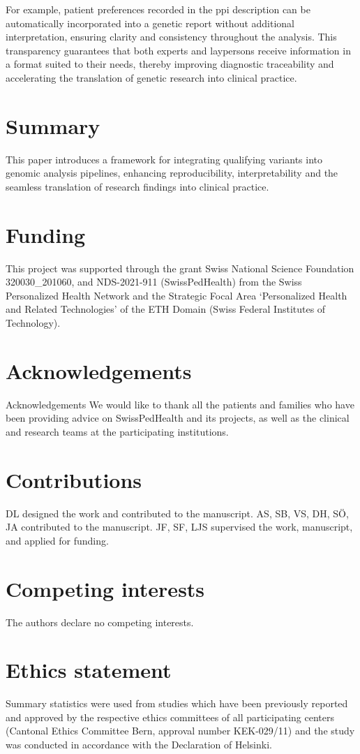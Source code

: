 For example, patient preferences recorded in the \ac{ppi} description can be automatically incorporated into a genetic report without additional interpretation, ensuring clarity and consistency throughout the analysis. This transparency guarantees that both experts and laypersons receive information in a format suited to their needs, thereby improving diagnostic traceability and accelerating the translation of genetic research into clinical practice.

\FloatBarrier

\section{Summary}
This paper introduces a framework for integrating qualifying variants into genomic analysis pipelines, enhancing reproducibility, interpretability and the seamless translation of research findings into clinical practice.

\section{Funding}
This project was supported through the grant Swiss National Science Foundation  320030\_201060, and NDS-2021-911 (SwissPedHealth) from the Swiss Personalized Health Network and the Strategic Focal Area `Personalized Health and Related Technologies' of the ETH Domain (Swiss Federal Institutes of Technology).

\section{Acknowledgements}
Acknowledgements We would like to thank all the patients and families who have been providing advice on SwissPedHealth and its projects, as well as the clinical and research teams at the participating institutions.

\section{Contributions}
DL designed the work and contributed to the manuscript.
AS, SB, VS, DH, SÖ, JA contributed to the manuscript.
JF, SF, LJS supervised the work, manuscript, and applied for funding.

\section{Competing interests}
The authors declare no competing interests.

\section{Ethics statement}
Summary statistics were used from studies which have been previously reported and approved by the respective ethics committees of all participating centers (Cantonal Ethics Committee Bern, approval number KEK-029/11) and the study was conducted in accordance with the Declaration of Helsinki.


 



